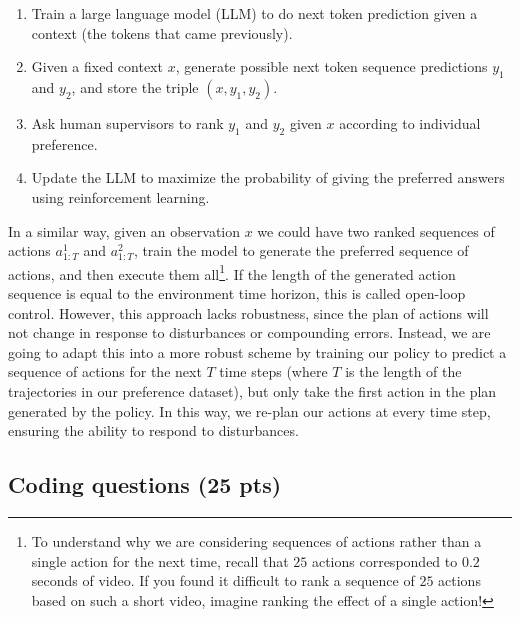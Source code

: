 \documentclass{article}
\begin{document}
\begin{enumerate}
    \item Train a large language model (LLM) to do next token prediction given a context (the tokens that came previously).
    \item Given a fixed context $x$, generate possible next token sequence predictions $y_1$ and $y_2$, and store the triple $(x, y_1, y_2)$.
    \item Ask human supervisors to rank $y_1$ and $y_2$ given $x$ according to individual preference.
    \item Update the LLM to maximize the probability of giving the preferred answers using reinforcement learning.
\end{enumerate}

In a similar way, given an observation $x$ we could have two ranked sequences of actions $a^1_{1:T}$ and $a^2_{1:T}$, train the model to generate the preferred sequence of actions, and then execute them all\footnote{To understand why we are considering sequences of actions rather than a single action for the next time, recall that $25$ actions corresponded to $0.2$ seconds of video. If you found it difficult to rank a sequence of $25$ actions based on such a short video, imagine ranking the effect of a single action!}. If the length of the generated action sequence is equal to the environment time horizon, this is called open-loop control. However, this approach lacks robustness, since the plan of actions will not change in response to disturbances or compounding errors. Instead, we are going to adapt this into a more robust scheme by training our policy to predict a sequence of actions for the next $T$ time steps (where $T$ is the length of the trajectories in our preference dataset), but only take the first action in the plan generated by the policy. In this way, we re-plan our actions at every time step, ensuring the ability to respond to disturbances.

\subsection{Coding questions (25 pts)}
\end{document}
